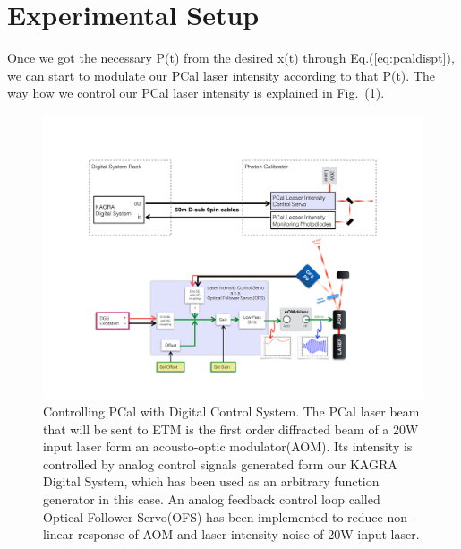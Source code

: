 \pagebreak
\section{Experimental Setup}

Once we got the necessary P(t) from the desired x(t) through Eq.(\ref{eq:pcaldispt}), we can start to modulate our PCal laser intensity according to that P(t). The way how we control our PCal laser intensity is explained in Fig.~(\ref{fig:injsigpath}).


\begin{figure}[hbt!]
\centering
\includegraphics[width=1\textwidth]{figure/injsigpath}
\caption[Controlling PCal with Digital Control System]{Controlling PCal with Digital Control System. The PCal laser beam that will be sent to ETM is the first order diffracted beam of a 20W input laser form an acousto-optic modulator(AOM). Its intensity is controlled by analog control signals generated form our KAGRA Digital System, which has been used as an arbitrary function generator in this case. An analog feedback control loop called Optical Follower Servo(OFS) has been implemented to reduce non-linear response of AOM and laser intensity noise of 20W input laser.  }
\label{fig:injsigpath}
\end{figure}


